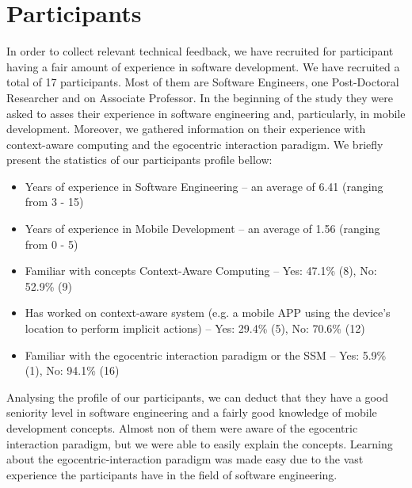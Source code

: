 \section{Participants} %
\label{sec:eval_participants}
In order to collect relevant technical feedback, we have recruited for participant having a fair amount of experience in software development. We have recruited a total of 17 participants. Most of them are Software Engineers, one Post-Doctoral Researcher and on Associate Professor. In the beginning of the study they were asked to asses their experience in software engineering and, particularly, in mobile development. Moreover, we gathered information on their experience with context-aware computing and the egocentric interaction paradigm. We briefly present the statistics of our participants profile bellow:
\begin{itemize}
	\item Years of experience in Software Engineering -- an average of 6.41 (ranging from 3 - 15)
	\item Years of experience in Mobile Development -- an average of 1.56 (ranging from 0 - 5)
	\item Familiar with concepts Context-Aware Computing -- Yes: 47.1\% (8), No: 52.9\% (9)
	\item Has worked on context-aware system (e.g. a mobile APP using the device's location to perform implicit actions) -- Yes: 29.4\% (5), No: 70.6\% (12)
	\item Familiar with the egocentric interaction paradigm or the SSM -- Yes: 5.9\% (1), No: 94.1\% (16)
\end{itemize}

Analysing the profile of our participants, we can deduct that they have a good seniority level in software engineering and a fairly good knowledge of mobile development concepts. Almost non of them were aware of the egocentric interaction paradigm, but we were able to easily explain the concepts. Learning about the egocentric-interaction paradigm was made easy due to the vast experience the participants have in the field of software engineering.
